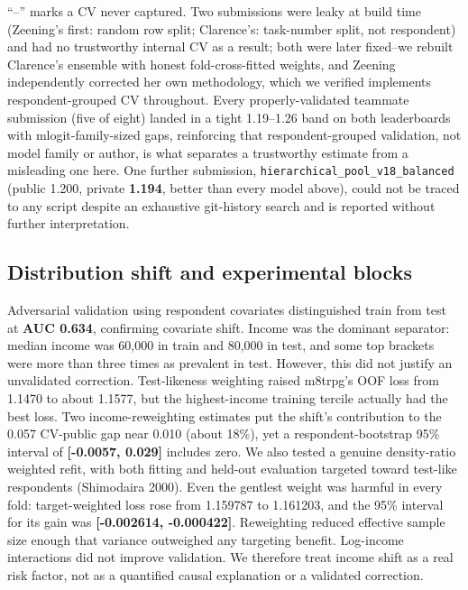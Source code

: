 \documentclass[
  9.5pt,
]{article}
\begin{document}
``--'' marks a CV never captured. Two submissions were leaky at build
time (Zeening's first: random row split; Clarence's: task-number split,
not respondent) and had no trustworthy internal CV as a result; both
were later fixed--we rebuilt Clarence's ensemble with honest
fold-cross-fitted weights, and Zeening independently corrected her own
methodology, which we verified implements respondent-grouped CV
throughout. Every properly-validated teammate submission (five of eight)
landed in a tight 1.19--1.26 band on both leaderboards with
mlogit-family-sized gaps, reinforcing that respondent-grouped
validation, not model family or author, is what separates a trustworthy
estimate from a misleading one here. One further submission,
\texttt{hierarchical\_pool\_v18\_balanced} (public 1.200, private
\textbf{1.194}, better than every model above), could not be traced to
any script despite an exhaustive git-history search and is reported
without further interpretation.

\subsection{Distribution shift and experimental
blocks}\label{distribution-shift-and-experimental-blocks}

Adversarial validation using respondent covariates distinguished train
from test at \textbf{AUC 0.634}, confirming covariate shift. Income was
the dominant separator: median income was 60,000 in train and 80,000 in
test, and some top brackets were more than three times as prevalent in
test. However, this did not justify an unvalidated correction.
Test-likeness weighting raised m8trpg's OOF loss from 1.1470 to about
1.1577, but the highest-income training tercile actually had the best
loss. Two income-reweighting estimates put the shift's contribution to
the 0.057 CV-public gap near 0.010 (about 18\%), yet a
respondent-bootstrap 95\% interval of \textbf{{[}-0.0057, 0.029{]}}
includes zero. We also tested a genuine density-ratio weighted refit,
with both fitting and held-out evaluation targeted toward test-like
respondents (Shimodaira 2000). Even the gentlest weight was harmful in
every fold: target-weighted loss rose from 1.159787 to 1.161203, and the
95\% interval for its gain was \textbf{{[}-0.002614, -0.000422{]}}.
Reweighting reduced effective sample size enough that variance
outweighed any targeting benefit. Log-income interactions did not
improve validation. We therefore treat income shift as a real risk
factor, not as a quantified causal explanation or a validated
correction.
\end{document}
